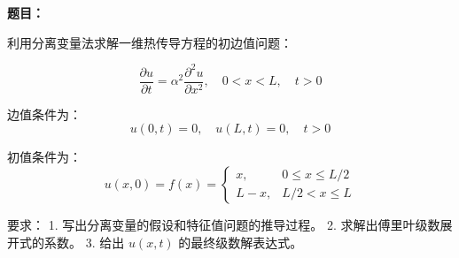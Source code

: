 \textbf{题目：}

利用分离变量法求解一维热传导方程的初边值问题：

$$ \frac{\partial u}{\partial t} = \alpha^2 \frac{\partial^2 u}{\partial x^2}, \quad 0 < x < L, \quad t > 0 $$

边值条件为：
$$ u(0, t) = 0, \quad u(L, t) = 0, \quad t > 0 $$

初值条件为：
$$ u(x, 0) = f(x) = \begin{cases} x, & 0 \leq x \leq L/2 \\ L - x, & L/2 < x \leq L \end{cases} $$

要求：
1. 写出分离变量的假设和特征值问题的推导过程。
2. 求解出傅里叶级数展开式的系数。
3. 给出 $u(x, t)$ 的最终级数解表达式。
